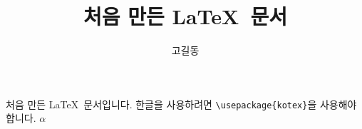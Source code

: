 \documentclass{oblivoir}
\title{처음 만든 \LaTeX\ 문서}
\author{고길동}
\begin{document}
	\maketitle
	처음 만든 \LaTeX\ 문서입니다. 한글을 사용하려면 \verb|\usepackage{kotex}|을 사용해야 합니다.
	$\alpha$
\end{document}
